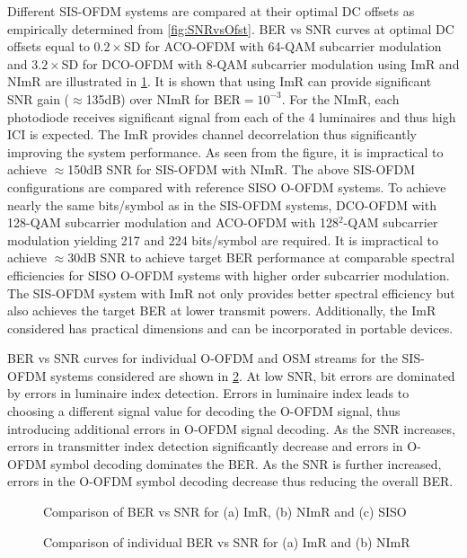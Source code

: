 \documentclass[12pt,letterpaper,onecolumn]{article} %
\begin{document}
Different SIS-OFDM systems are compared at their optimal DC offsets as empirically determined from \figurename{\ref{fig:SNRvsOfst}}. BER vs SNR curves at optimal DC offsets equal to $0.2\times$SD for ACO-OFDM with 64-QAM subcarrier modulation and $3.2\times$SD for DCO-OFDM with 8-QAM subcarrier modulation using ImR and NImR are illustrated in \figurename{\ref{fig:BERnet}}. It is shown that using ImR can provide significant SNR gain ($\approx$135dB) over NImR for BER$=10^{-3}$. For the NImR, each photodiode receives significant signal from each of the 4 luminaires and thus high ICI is expected. The ImR provides channel decorrelation thus significantly improving the system performance. As seen from the figure, it is impractical to achieve $\approx$150dB SNR for SIS-OFDM with NImR. The above SIS-OFDM configurations are compared with reference SISO O-OFDM systems. To achieve nearly the same bits/symbol as in the SIS-OFDM systems, DCO-OFDM with 128-QAM subcarrier modulation and ACO-OFDM with 128$^2$-QAM subcarrier modulation yielding 217 and 224 bits/symbol are required. It is impractical to achieve $\approx$30dB SNR to achieve target BER performance at comparable spectral efficiencies for SISO O-OFDM systems with higher order subcarrier modulation. The SIS-OFDM system with ImR not only provides better spectral efficiency but also achieves the target BER at lower transmit powers. Additionally, the ImR considered has practical dimensions and can be incorporated in portable devices.

BER vs SNR curves for individual O-OFDM and OSM streams for the SIS-OFDM systems considered are shown in \figurename{\ref{fig:BERsplit}}. At low SNR, bit errors are dominated by errors in luminaire index detection. Errors in luminaire index leads to choosing a different signal value for decoding the O-OFDM signal, thus introducing additional errors in O-OFDM signal decoding. As the SNR increases, errors in transmitter index detection significantly decrease and errors in O-OFDM symbol decoding dominates the BER. As the SNR is further increased, errors in the O-OFDM symbol decoding decrease thus reducing the overall BER.
\begin{figure}[!t]
\makebox[\textwidth]{\framebox[3.3in]{\rule{0pt}{2.48in}}}
\caption{Comparison of BER vs SNR for (a) ImR, (b) NImR and (c) SISO}
	\label{fig:BERnet}
\end{figure}
\begin{figure}[!t]
\makebox[\textwidth]{\framebox[3.3in]{\rule{0pt}{2.48in}}}
\caption{Comparison of individual BER vs SNR for (a) ImR and (b) NImR}
	\label{fig:BERsplit}
\end{figure}
\end{document}
